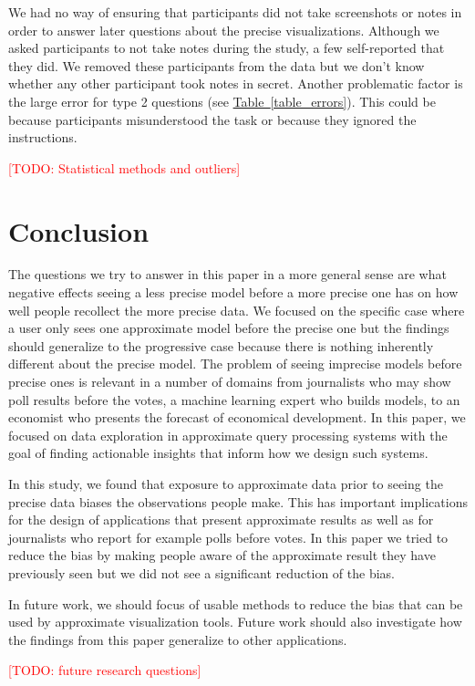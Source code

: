 \documentclass[10pt,journal,compsoc]{IEEEtran}
\newcommand{\tabref}[1]{\hyperref[#1]{Table~\ref*{#1}}}
\newcommand{\note}[2]{\textcolor{#1}{[#2]}}
\newcommand{\todo}[1]{\note{red}{TODO: #1}}
\begin{document}
We had no way of ensuring that participants did not take screenshots or notes in order to answer later questions about the precise visualizations.
Although we asked participants to not take notes during the study, a few self-reported that they did.
We removed these participants from the data but we don't know whether any other participant took notes in secret.
Another problematic factor is the large error for type 2 questions (see \tabref{table_errors}).
This could be because participants misunderstood the task or because they ignored the instructions.

\todo{Statistical methods and outliers}

\section{Conclusion}

The questions we try to answer in this paper in a more general sense are what negative effects seeing a less precise model before a more precise one has on how well people recollect the more precise data.
We focused on the specific case where a user only sees one approximate model before the precise one but the findings should generalize to the progressive case because there is nothing inherently different about the precise model.
The problem of seeing imprecise models before precise ones is relevant in a number of domains from journalists who may show poll results before the votes, a machine learning expert who builds models, to an economist who presents the forecast of economical development.
In this paper, we focused on data exploration in approximate query processing systems with the goal of finding actionable insights that inform how we design such systems.

In this study, we found that exposure to approximate data prior to seeing the precise data biases the observations people make.
This has important implications for the design of applications that present approximate results as well as for journalists who report for example polls before votes.
In this paper we tried to reduce the bias by making people aware of the approximate result they have previously seen but we did not see a significant reduction of the bias.


In future work, we should focus of usable methods to reduce the bias that can be used by approximate visualization tools.
Future work should also investigate how the findings from this paper generalize to other applications.

\todo{future research questions}
\end{document}
